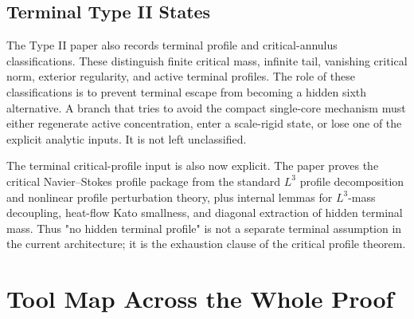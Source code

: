 \documentclass[11pt]{amsart}
\begin{document}
\subsection{Terminal Type II States}

The Type II paper also records terminal profile and critical-annulus classifications.  These distinguish finite critical mass, infinite tail, vanishing critical norm, exterior regularity, and active terminal profiles. The role of these classifications is to prevent terminal escape from becoming a hidden sixth alternative.  A branch that tries to avoid the compact single-core mechanism must either regenerate active concentration, enter a scale-rigid state, or lose one of the explicit analytic inputs.  It is not left unclassified.

The terminal critical-profile input is also now explicit.  The paper proves the critical Navier--Stokes profile package from the standard \(L^3\) profile decomposition and nonlinear profile perturbation theory, plus internal lemmas for \(L^3\)-mass decoupling, heat-flow Kato smallness, and diagonal extraction of hidden terminal mass.  Thus "no hidden terminal profile" is not a separate terminal assumption in the current architecture; it is the exhaustion clause of the critical profile theorem.

\section{Tool Map Across the Whole Proof}
\end{document}

